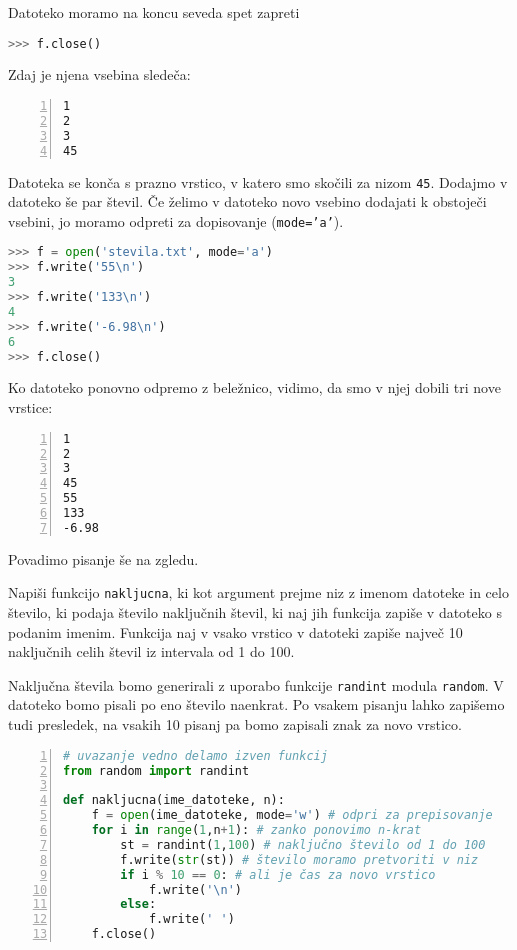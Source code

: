 Datoteko moramo na koncu seveda spet zapreti
\begin{lstlisting}[language=Python, showstringspaces=false]
>>> f.close()
\end{lstlisting}
Zdaj je njena vsebina sledeča:
\begin{lstlisting}[showstringspaces=false,numbers=left,showlines=true]
1
2
3
45

\end{lstlisting}
Datoteka se konča s prazno vrstico, v katero smo skočili za nizom \texttt{45}. Dodajmo v datoteko še par števil. Če želimo v datoteko novo vsebino dodajati k obstoječi vsebini, jo moramo odpreti za dopisovanje (\texttt{mode='a'}).
\begin{lstlisting}[language=Python, showstringspaces=false]
>>> f = open('stevila.txt', mode='a')
>>> f.write('55\n')
3
>>> f.write('133\n')
4
>>> f.write('-6.98\n')
6
>>> f.close()
\end{lstlisting}
Ko datoteko ponovno odpremo z beležnico, vidimo, da smo v njej dobili tri nove vrstice:
\begin{lstlisting}[showstringspaces=false,numbers=left,showlines=true]
1
2
3
45
55
133
-6.98

\end{lstlisting}

Povadimo pisanje še na zgledu.
\begin{zgled}
Napiši funkcijo \texttt{nakljucna}, ki kot argument prejme niz z imenom datoteke in celo število, ki podaja število naključnih števil, ki naj jih funkcija zapiše v datoteko s podanim imenim. Funkcija naj v vsako vrstico v datoteki zapiše največ 10 naključnih celih števil iz intervala od 1 do 100.
\end{zgled}
\begin{resitev}
Naključna števila bomo generirali z uporabo funkcije \texttt{randint} modula \texttt{random}. V datoteko bomo pisali po eno število naenkrat. Po vsakem pisanju lahko zapišemo tudi presledek, na vsakih 10 pisanj pa bomo zapisali znak za novo vrstico.
\begin{lstlisting}[language=Python, showstringspaces=false,numbers=left]
# uvazanje vedno delamo izven funkcij
from random import randint

def nakljucna(ime_datoteke, n):
    f = open(ime_datoteke, mode='w') # odpri za prepisovanje
    for i in range(1,n+1): # zanko ponovimo n-krat
        st = randint(1,100) # naključno število od 1 do 100
        f.write(str(st)) # število moramo pretvoriti v niz
        if i % 10 == 0: # ali je čas za novo vrstico
            f.write('\n')
        else:
            f.write(' ')
    f.close()
\end{lstlisting}
\end{resitev}

